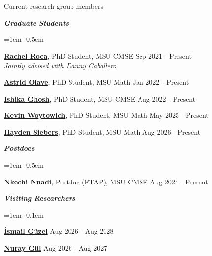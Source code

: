 \documentclass{resume} %
\begin{document}
\newpage
\begin{rSection}{Current research group members}


\textbf{\textit{Graduate Students}}
\begin{list}{}{\leftmargin=1em}
   \itemsep -0.5em %

   \item \textbf{\href{https://sites.google.com/manhattan.edu/racheleroca/home}{Rachel Roca}}, PhD Student, MSU CMSE \hfill Sep 2021 - Present
\\
   \phantom{XXX} \textit{Jointly advised with Danny Caballero}


   

   \item \textbf{\href{https://aaolaveh.github.io/}{Astrid Olave}}, PhD Student, MSU Math \hfill Jan 2022 - Present
   

   
   \item \textbf{\href{https://www.ishikaghosh.com/}{Ishika Ghosh}}, PhD Student, MSU CMSE \hfill Aug 2022 - Present
   

   \item \textbf{\href{https://directory.natsci.msu.edu/directory/Profiles/Person/103810}{Kevin Woytowich}}, PhD Student, MSU Math \hfill May 2025 - Present
   
   \item \textbf{\href{https://haydensiebers.github.io/}{Hayden Siebers}}, PhD Student, MSU Math \hfill Aug 2026 - Present




\end{list}


\textbf{\textit{Postdocs}}
\begin{list}{}{\leftmargin=1em}
   \itemsep -0.5em %




   \item \textbf{\href{https://nkechic.org}{Nkechi Nnadi}}, Postdoc (FTAP), MSU CMSE \hfill Aug 2024 - Present


\end{list}


\textbf{\textit{Visiting Researchers}}
\begin{list}{}{\leftmargin=1em}
   \itemsep -0.1em %
   \item \textbf{\href{https://ismailguzel.github.io/}{\.{I}smail G\"{u}zel}} \hfill Aug 2026 - Aug 2028
   \item \textbf{\href{https://directory.natsci.msu.edu/directory/Profiles/Person/106040?org=44&group=85}{Nuray Gül}} \hfill Aug 2026 - Aug 2027
\end{list}

\end{rSection}
\end{document}
